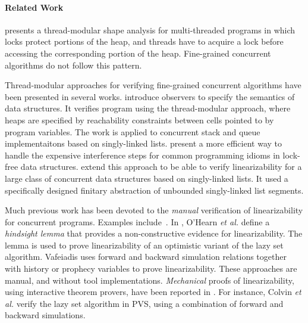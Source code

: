 \paragraph{Related Work}
\cite{GBCS:pldi07} presents a thread-modular shape analysis for multi-threaded
programs in which locks protect portions of the heap, and threads have to
acquire a lock before accessing the corresponding portion of the heap.
Fine-grained concurrent algorithms do not follow this pattern.

Thread-modular approaches for verifying fine-grained concurrent algorithms
have been presented in several works. 
\cite{AHHR:integrated} introduce observers to specify the semantics of
data structures. It verifies program using the thread-modular approach, where
heaps are specified by reachability constraints between cells pointed to
by program variables. The work is applied to concurrent stack and
queue implementaitons based on singly-linked lists.
\cite{Holik:sas17} present a more efficient way to handle the expensive
interference steps for common programming idioms in lock-free data structures.
\cite{Quy:sas16} extend this approach to be able to verify linearizability
for a large class of concurrent data structures based on singly-linked lists.
It used a specifically designed finitary abstraction of unbounded singly-linked
list segments.



Much previous work has been devoted to
the {\it manual} verification of linearizability for
concurrent programs. Examples
include~\cite{LF:pldi13,Aaron:logical:linearizability}.
%
In \cite{OHearnlist}, O'Hearn {\it et al.}  define a
{\it hindsight lemma} that
provides a non-constructive evidence for linearizability. 
%
The lemma is used to prove linearizability of an optimistic variant of 
the lazy set algorithm.
Vafeiadis \cite{Vafeiadis:Thesis}
uses forward and backward simulation relations together
with history or prophecy variables to prove linearizability.
%
These approaches are manual, and without
tool implementations.
{\it Mechanical} proofs of linearizability, using interactive theorem
provers, have been reported in 
\cite{Colvin:Lazy-List,Derrick:fm14,SWD:cav12,SDW:tcl14}.
%
For instance, Colvin {\it et al.} \cite{Colvin:Lazy-List}
verify the lazy set algorithm in  PVS,
using a combination of forward and backward simulations.

